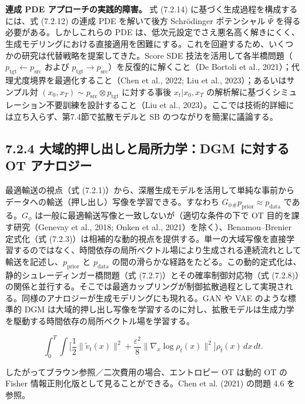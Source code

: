 \textbf{連成 PDE アプローチの実践的障害。} 式 (7.2.14) に基づく生成過程を構成するには、式 (7.2.12) の連成 PDE を解いて後方 Schrödinger ポテンシャル $\widehat{\Psi}$ を得る必要がある。しかしこれらの PDE は、低次元設定でさえ悪名高く解きにくく、生成モデリングにおける直接適用を困難にする。これを回避するため、いくつかの研究は代替戦略を提案してきた。Score SDE 技法を活用して各半橋問題（$p_{\mathrm{tgt}}\leftarrow p_{\mathrm{src}}$ および $p_{\mathrm{tgt}}\to p_{\mathrm{src}}$）を反復的に解くこと（De Bortoli et al., 2021）；代理尤度境界を最適化すること（Chen et al., 2022; Liu et al., 2023）；あるいはサンプル対 $(x_0,x_T)\sim p_{\mathrm{src}}\otimes p_{\mathrm{tgt}}$ に対する事後 $x_t|x_0,x_T$ の解析解に基づくシミュレーション不要訓練を設計すること（Liu et al., 2023）。ここでは技術的詳細には立ち入らず、第7.4節で拡散モデルと SB のつながりを簡潔に議論する。

\subsection*{7.2.4 大域的押し出しと局所力学：DGM に対する OT アナロジー}


最適輸送の視点（式 (7.2.1)）から、深層生成モデルを活用して単純な事前からデータへの輸送（押し出し）写像を学習できる。すなわち $G_\phi{}_{\#}p_{\mathrm{prior}}\approx p_{\mathrm{data}}$ である。$G_\phi$ は一般に最適輸送写像と一致しないが（適切な条件の下で OT 目的を課す研究（Genevay et al., 2018; Onken et al., 2021）を除く）、Benamou–Brenier 定式化（式 (7.2.3)）は相補的な動的視点を提供する。単一の大域写像を直接学習するのではなく、時間依存の局所ベクトル場により生成される連続流れとして輸送を記述し、$p_{\mathrm{prior}}$ と $p_{\mathrm{data}}$ の間の滑らかな経路をたどる。この動的定式化は、静的シュレーディンガー橋問題（式 (7.2.7)）とその確率制御対応物（式 (7.2.8)）の関係と並行する。そこでは最適カップリングが制御拡散過程として実現される。同様のアナロジーが生成モデリングにも現れる。GAN や VAE のような標準的 DGM は大域的押し出し写像を学習するのに対し、拡散モデルは生成力学を駆動する時間依存の局所ベクトル場を学習する。







\[
\int_0^T\int\Biggl[\frac{1}{2}\|\tilde{v}_t(x)\|^2+\frac{\varepsilon^2}{8}\|\nabla_x\log\rho_t(x)\|^2\Biggr]\rho_t(x)\,dx\,dt.
\]


したがってブラウン参照／二次費用の場合、エントロピー OT は動的 OT の Fisher 情報正則化版として見ることができる。Chen et al. (2021) の問題 4.6 を参照。

